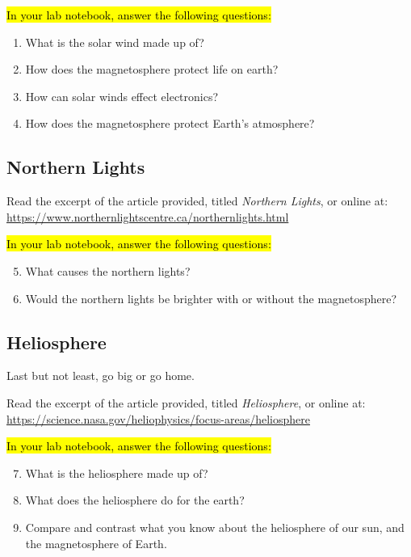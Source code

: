 \documentclass[14pt, fleqn, paper=letter, oneside]{scrartcl}
\begin{document}
\hl{In your lab notebook, answer the following questions:}
\begin{enumerate}[nosep]
\setcounter{enumi}{0}
\item What is the solar wind made up of?
\item How does the magnetosphere protect life on earth?
\item How can solar winds effect electronics?
\item How does the magnetosphere protect Earth's atmosphere?
\end{enumerate}

\subsection{Northern Lights}
Read the excerpt of the article provided, titled \emph{Northern Lights}, or online at:
\url{https://www.northernlightscentre.ca/northernlights.html}

\hl{In your lab notebook, answer the following questions:}
\begin{enumerate}[nosep]
\setcounter{enumi}{4}
\item What causes the northern lights?
\item Would the northern lights be brighter with or without the magnetosphere?
\end{enumerate}


\subsection{Heliosphere}
Last but not least, go big or go home.

Read the excerpt of the article provided, titled \emph{Heliosphere}, or online at:
\url{https://science.nasa.gov/heliophysics/focus-areas/heliosphere}

\hl{In your lab notebook, answer the following questions:}
\begin{enumerate}[nosep]
\setcounter{enumi}{6}
\item What is the heliosphere made up of?
\item What does the heliosphere do for the earth?
\item Compare and contrast what you know about the heliosphere of our sun, and the magnetosphere of Earth.
\end{enumerate}
\end{document}
